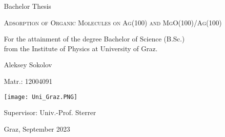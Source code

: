 \begin{titlepage}
    \centering
    \vspace{8cm}
    {Bachelor Thesis \par}
    
    {\scshape\LARGE Adsorption of Organic Molecules on Ag(100) and MgO(100)/Ag(100) \par}
    
    \vspace{3cm}
    {\large For the attainment of the degree Bachelor of Science (B.Sc.) \\ from the Institute of Physics at University of Graz. \par } 
    {\large Aleksey Sokolov  \par}
    {\large Matr.: 12004091 \par}
    \vspace{5cm}
    \vfill
    {\texttt{[image: Uni\_Graz.PNG]}\par}
    
    
    {\large Supervisor: Univ.-Prof. Sterrer \par}
    
    {\large Graz, September 2023\par} 
\end{titlepage}